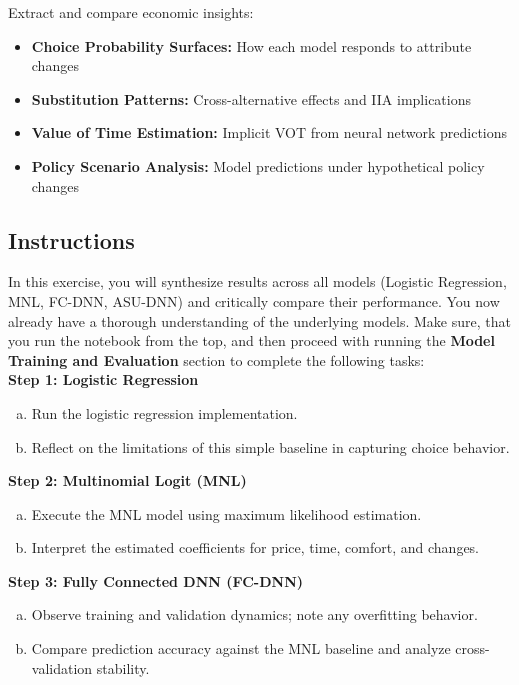 \documentclass[11pt]{article}
\begin{document}
Extract and compare economic insights:
\begin{itemize}
\item \textbf{Choice Probability Surfaces:} How each model responds to attribute changes
\item \textbf{Substitution Patterns:} Cross-alternative effects and IIA implications
\item \textbf{Value of Time Estimation:} Implicit VOT from neural network predictions
\item \textbf{Policy Scenario Analysis:} Model predictions under hypothetical policy changes
\end{itemize}

\subsection*{Instructions}

In this exercise, you will synthesize results across all models (Logistic Regression, MNL, FC-DNN, ASU-DNN) and critically compare their performance. 
You now already have a thorough understanding of the underlying models. Make sure, that you run the notebook from the top, and then proceed with running the \textbf{Model Training and Evaluation} section to complete the following tasks:\\

\noindent\textbf{Step 1: Logistic Regression}
\begin{enumerate}[(a)]
\item Run the logistic regression implementation.
\item Reflect on the limitations of this simple baseline in capturing choice behavior.  
\end{enumerate}

\noindent\textbf{Step 2: Multinomial Logit (MNL)}
\begin{enumerate}[(a)]
\item Execute the MNL model using maximum likelihood estimation.
\item Interpret the estimated coefficients for price, time, comfort, and changes.
\end{enumerate}

\noindent\textbf{Step 3: Fully Connected DNN (FC-DNN)}
\begin{enumerate}[(a)]
\item Observe training and validation dynamics; note any overfitting behavior.  
\item Compare prediction accuracy against the MNL baseline and analyze cross-validation stability.
\end{enumerate}
\end{document}
